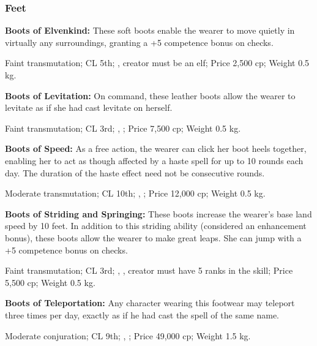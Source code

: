 \subsubsection{Feet}

\textbf{Boots of Elvenkind:} These soft boots enable the wearer to move quietly in virtually any surroundings, granting a +5 competence bonus on  checks.

Faint transmutation; CL 5th; , creator must be an elf; Price 2,500 cp; Weight 0.5 kg.

\textbf{Boots of Levitation:} On command, these leather boots allow the wearer to levitate as if she had cast levitate on herself.

Faint transmutation; CL 3rd; , ; Price 7,500 cp; Weight 0.5 kg.

\textbf{Boots of Speed:} As a free action, the wearer can click her boot heels together, enabling her to act as though affected by a haste spell for up to 10 rounds each day. The duration of the haste effect need not be consecutive rounds.

Moderate transmutation; CL 10th; , ; Price 12,000 cp; Weight 0.5 kg.

\textbf{Boots of Striding and Springing:} These boots increase the wearer's base land speed by 10 feet. In addition to this striding ability (considered an enhancement bonus), these boots allow the wearer to make great leaps. She can jump with a +5 competence bonus on  checks.

Faint transmutation; CL 3rd; , , creator must have 5 ranks in the  skill; Price 5,500 cp; Weight 0.5 kg.

\textbf{Boots of Teleportation:} Any character wearing this footwear may teleport three times per day, exactly as if he had cast the spell of the same name.

Moderate conjuration; CL 9th; , ; Price 49,000 cp; Weight 1.5 kg.


